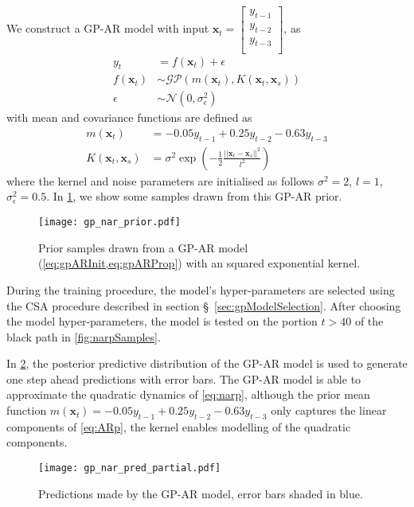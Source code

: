 We construct a GP-AR model with input 
$\mathbf{x}_t = \begin{bmatrix} y_{t-1}\\ y_{t-2}\\ y_{t-3}\\ \end{bmatrix}$, as
%
\begin{equation*}
    \begin{aligned}
        y_t &= f(\mathbf{x}_t) + \epsilon \\
        f(\mathbf{x}_t) &\sim \mathcal{GP}(m(\mathbf{x}_t), K(\mathbf{x}_t, \mathbf{x}_s)) \\
        \epsilon &\sim \mathcal{N}(0, \sigma_{\epsilon}^{2})
    \end{aligned}
\end{equation*}
%
with mean and covariance functions are defined as
\begin{equation*}
    \begin{aligned}
        m(\mathbf{x}_t) &=  -0.05 y_{t-1} + 0.25 y_{t-2} - 0.63 y_{t-3}\\
        K(\mathbf{x}_t, \mathbf{x}_s) &= \sigma^2 
        \exp \left(-\frac{1}{2} \frac{\rvert \rvert \mathbf{x}_t - \mathbf{x}_s \rvert \rvert ^2}{l^2} \right)
    \end{aligned}
\end{equation*}
where the kernel and noise parameters are initialised as follows $\sigma^2 = 2$, $l = 1$, 
$\sigma_{\epsilon}^{2} = 0.5$. In \cref{fig:gparPrior}, we show some samples drawn from this GP-AR prior.
%
\begin{figure}[ht]
    \centering
    \noindent\texttt{[image: gp\_nar\_prior.pdf]}
    \caption{Prior samples drawn from a GP-AR model (\cref{eq:gpARInit,eq:gpARProp}) with an squared exponential kernel.}
    \label{fig:gparPrior}
\end{figure}
%
During the training procedure, the model's hyper-parameters are selected using the CSA procedure described in 
section \S~\ref{sec:gpModelSelection}. After choosing the model hyper-parameters, the model is tested on the 
portion $t > 40$ of the black path in \cref{fig:narpSamples}. 

In \cref{fig:gparPost}, the posterior predictive distribution of the GP-AR model is used to generate one step ahead 
predictions with error bars. The GP-AR model is able to approximate the quadratic dynamics of \cref{eq:narp}, 
although the prior mean function $m(\mathbf{x}_t) =  -0.05 y_{t-1} + 0.25 y_{t-2} - 0.63 y_{t-3}$ only captures 
the linear components of \cref{eq:ARp}, the kernel enables modelling of the quadratic components.

\begin{figure}[ht]
    \centering
    \noindent\texttt{[image: gp\_nar\_pred\_partial.pdf]}
    \caption{Predictions made by the GP-AR model, error bars shaded in blue.}
    \label{fig:gparPost}
\end{figure}

